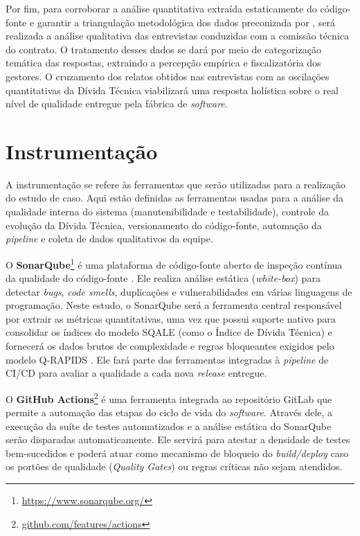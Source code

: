 Por fim, para corroborar a análise quantitativa extraída estaticamente do código-fonte e garantir a triangulação metodológica dos dados preconizada por , será realizada a análise qualitativa das entrevistas conduzidas com a comissão técnica do contrato. O tratamento desses dados se dará por meio de categorização temática das respostas, extraindo a percepção empírica e fiscalizatória dos gestores. O cruzamento dos relatos obtidos nas entrevistas com as oscilações quantitativas da Dívida Técnica viabilizará uma resposta holística sobre o real nível de qualidade entregue pela fábrica de \textit{software}.

\section{Instrumentação}

A instrumentação se refere às ferramentas que serão utilizadas para a realização do estudo de caso. Aqui estão definidas as ferramentas usadas para a análise da qualidade interna do sistema (manutenibilidade e testabilidade), controle da evolução da Dívida Técnica, versionamento do código-fonte, automação da \textit{pipeline} e coleta de dados qualitativos da equipe.

O \textbf{SonarQube}\footnote{\url{https://www.sonarqube.org/}} é uma plataforma de código-fonte aberto de inspeção contínua da qualidade do código-fonte \cite{letouzey2010}. Ele realiza análise estática (\textit{white-box}) para detectar \textit{bugs}, \textit{code smells}, duplicações e vulnerabilidades em várias linguagens de programação. Neste estudo, o SonarQube será a ferramenta central responsável por extrair as métricas quantitativas, uma vez que possui suporte nativo para consolidar os índices do modelo SQALE \cite{letouzey2010} (como o Índice de Dívida Técnica) e fornecerá os dados brutos de complexidade e regras bloqueantes exigidos pelo modelo Q-RAPIDS \cite{qrapids2019}. Ele fará parte das ferramentas integradas à \textit{pipeline} de CI/CD para avaliar a qualidade a cada nova \textit{release} entregue.

O \textbf{GitHub Actions}\footnote{\url{github.com/features/actions}} é uma ferramenta integrada ao repositório GitLab que permite a automação das etapas do ciclo de vida do \textit{software}. Através dele, a execução da suíte de testes automatizados e a análise estática do SonarQube serão disparadas automaticamente. Ele servirá para atestar a densidade de testes bem-sucedidos \cite{qrapids2019} e poderá atuar como mecanismo de bloqueio do \textit{build/deploy} caso os portões de qualidade (\textit{Quality Gates}) ou regras críticas não sejam atendidos.

